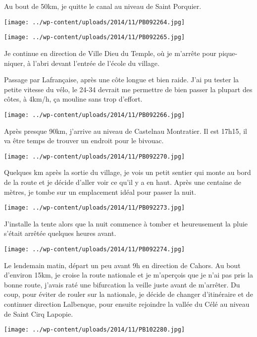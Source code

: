  Au bout de 50km, je quitte le canal au niveau de Saint Porquier.
\begin{center} \texttt{[image: ../wp-content/uploads/2014/11/PB092264.jpg]} \end{center}
\begin{center} \texttt{[image: ../wp-content/uploads/2014/11/PB092265.jpg]} \end{center}

 Je continue en direction de Ville Dieu du Temple, où je m'arrête pour pique-niquer, à l'abri devant l'entrée de l'école du village.

 Passage par Lafrançaise, après une côte longue et bien raide. J'ai pu tester la petite vitesse du vélo, le 24-34 devrait me permettre de bien passer la plupart des côtes, à 4km/h, ça mouline sans trop d'effort.
\begin{center} \texttt{[image: ../wp-content/uploads/2014/11/PB092266.jpg]} \end{center}
\vspace{-\topsep}

\pagebreak
 Après presque 90km, j'arrive au niveau de Castelnau Montratier. Il est 17h15, il va être temps de trouver un endroit pour le bivouac.
\begin{center} \texttt{[image: ../wp-content/uploads/2014/11/PB092270.jpg]} \end{center}

 Quelques km après la sortie du village, je vois un petit sentier qui monte au bord de la route et je décide d'aller voir ce qu'il y a en haut. Après une centaine de mètres, je tombe sur un emplacement idéal pour passer la nuit.
\begin{center} \texttt{[image: ../wp-content/uploads/2014/11/PB092273.jpg]} \end{center}

 J'installe la tente alors que la nuit commence à tomber et heureusement la pluie s'était arrêtée quelques heures avant. 
\begin{center} \texttt{[image: ../wp-content/uploads/2014/11/PB092274.jpg]} \end{center}

 Le lendemain matin, départ un peu avant 9h en direction de Cahors. Au bout d'environ 15km, je croise la route nationale et je m'aperçois que je n'ai pas pris la bonne route, j'avais raté une bifurcation la veille juste avant de m'arrêter.
 Du coup, pour éviter de rouler sur la nationale, je décide de changer d'itinéraire et de continuer direction Lalbenque, pour ensuite rejoindre la vallée du Célé au niveau de Saint Cirq Lapopie.
\begin{center} \texttt{[image: ../wp-content/uploads/2014/11/PB102280.jpg]} \end{center}

